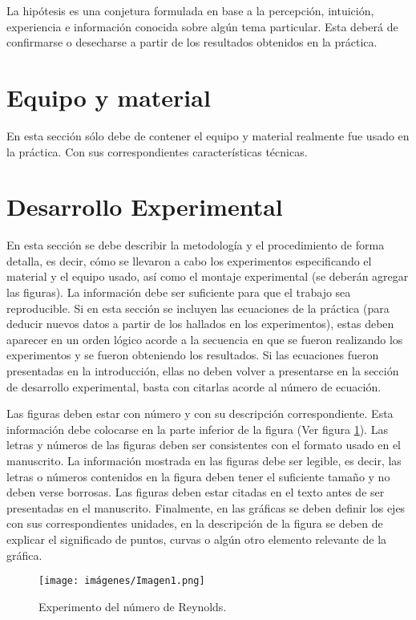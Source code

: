 \documentclass{replab}
\begin{document}
La hipótesis es una conjetura formulada en base a la percepción, intuición, experiencia e información conocida sobre algún tema particular. Esta deberá de confirmarse o desecharse a partir de los resultados obtenidos en la práctica.

\section{Equipo y material}

En esta sección sólo debe de contener el equipo y material realmente fue usado en la práctica. Con sus correspondientes características técnicas.

\section{Desarrollo Experimental}

En esta sección se debe describir la metodología y el procedimiento de forma detalla, es decir, cómo se llevaron a cabo los experimentos especificando el material y el equipo usado, así como el montaje experimental (se deberán agregar las figuras). La información debe ser suficiente para que el trabajo sea reproducible. Si en esta sección se incluyen las ecuaciones de la práctica (para deducir nuevos datos a partir de los hallados en los experimentos), estas deben aparecer en un orden lógico acorde a la secuencia en que se fueron realizando los experimentos y se fueron obteniendo los resultados. Si las ecuaciones fueron presentadas en la introducción, ellas no deben volver a presentarse en la sección de desarrollo experimental, basta con citarlas acorde al número de ecuación.

Las figuras deben estar con número y con su descripción correspondiente. Esta información debe colocarse en la parte inferior de la figura (Ver figura \ref{fig:numerouno}). Las letras y números de las figuras deben ser consistentes con el formato usado en el manuscrito. La información mostrada en las figuras debe ser legible, es decir, las letras o números contenidos en la figura deben tener el suficiente tamaño y no deben verse borrosas. Las figuras deben estar citadas en el texto antes de ser presentadas en el manuscrito. Finalmente, en las gráficas se deben definir los ejes con sus correspondientes unidades, en la descripción de la figura se deben de explicar el significado de puntos, curvas o algún otro elemento relevante de la gráfica.

\begin{figure}[hbt!]
    \centering
    \texttt{[image: imágenes/Imagen1.png]}
    \caption{Experimento del número de Reynolds.}
    \label{fig:numerouno}
\end{figure}
\end{document}
